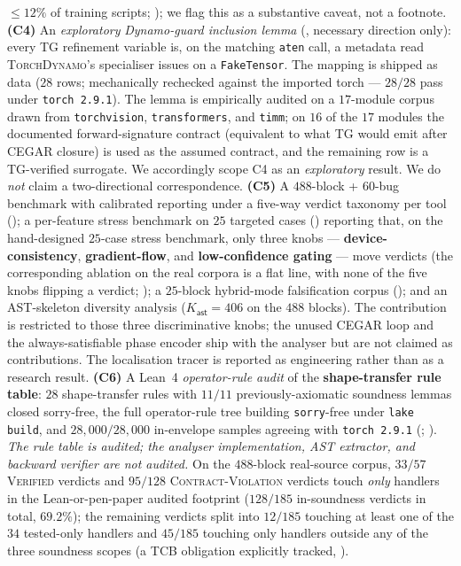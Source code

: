 $\le 12\%$ of training scripts; ); we flag this as
a substantive caveat, not a footnote.
\textbf{(C4)} An \emph{exploratory} \emph{Dynamo-guard inclusion lemma}
(, necessary direction only): every
\textsc{TG} refinement variable is, on the matching
\texttt{aten} call, a metadata read \textsc{TorchDynamo}'s
specialiser issues on a \texttt{FakeTensor}. The mapping is
shipped as data ($28$ rows; mechanically rechecked
against the imported torch --- $28/28$ pass under \texttt{torch~2.9.1}). The lemma is
empirically audited on a $17$-module corpus drawn from
\texttt{torchvision}, \texttt{transformers}, and \texttt{timm}; on
$16$ of the $17$ modules the documented forward-signature contract
(equivalent to what TG would emit after CEGAR closure) is used as
the assumed contract, and the remaining row is a TG-verified
surrogate. We accordingly
scope C4 as an \emph{exploratory} result.  We do \emph{not} claim a
two-directional correspondence.
\textbf{(C5)} A $488$-block + $60$-bug benchmark with calibrated reporting under a five-way verdict
taxonomy per tool ();
a per-feature stress benchmark on $25$ targeted cases
() reporting that, on the
hand-designed $25$-case stress benchmark, only three knobs ---
\textbf{device-consistency}, \textbf{gradient-flow}, and
\textbf{low-confidence gating} --- move verdicts (the
corresponding ablation on the real corpora is a flat line, with
none of the five knobs flipping a verdict;
); a $25$-block hybrid-mode falsification corpus
(); and an AST-skeleton diversity
analysis ($K_{\mathsf{ast}}{=}406$ on the $488$ blocks).
The contribution is restricted to those three discriminative
knobs; the unused CEGAR loop and the always-satisfiable
phase encoder ship with the analyser but are not claimed as
contributions.
The localisation tracer is reported as engineering rather
than as a research result.
\textbf{(C6)} A Lean~4 \emph{operator-rule audit} of the
\textbf{shape-transfer rule table}: $28$
shape-transfer rules with $11/11$ previously-axiomatic
soundness lemmas closed sorry-free, the full
operator-rule tree building \texttt{sorry}-free
under \texttt{lake build}, and
$28{,}000/28{,}000$ in-envelope samples agreeing with
\texttt{torch~2.9.1} (;
). \emph{The rule table is
audited; the analyser implementation, AST extractor, and
backward verifier are \emph{not} audited.} On the $488$-block
real-source corpus, $33/57$ \textsc{Verified} verdicts and
$95/128$ \textsc{Contract-Violation} verdicts touch \emph{only}
handlers in the Lean-or-pen-paper audited footprint
($128/185$ in-soundness verdicts in total, $69.2\%$); the
remaining verdicts split into $12/185$ touching at least one
of the $34$ tested-only handlers and $45/185$ touching only
handlers outside any of the three soundness scopes (a TCB
obligation explicitly tracked, ).
